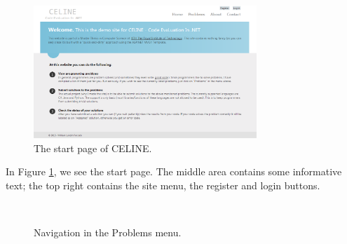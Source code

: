 \begin{figure}[h]
	\centering
	\includegraphics[width=0.75\textwidth]{chapters/media/celine_startpage.png}
	\caption{The start page of CELINE.}
	\label{fig:celine_startpage}
\end{figure}

In Figure \ref{fig:celine_startpage}, we see the start page. The middle area contains some informative text; the top right contains the site menu, the register and login buttons.

\begin{figure}[h]
\centering
\mbox{
}
\caption{Navigation in the Problems menu.}
\label{fig:celine_split_problemlist_easysort}
\end{figure}

